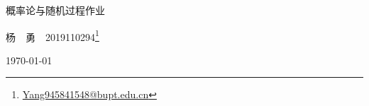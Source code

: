 \documentclass[11pt,UTF8]{ctexbook}
\newcommand{\hei}{\heiti}
\theoremstyle{plain}
\numberwithin{equation}{chapter}
\numberwithin{algorithm}{chapter}
\begin{document}
	
	\frontmatter
	\begin{titlepage}\Large
		\renewcommand{\thefootnote}{\fnsymbol{footnote}}
		\begin{center}
			\vspace*{3cm}
			{\hei\Huge 概率论与随机过程作业} \bigskip
			
			{\hei\LARGE 杨~~勇~~2019110294\footnote{{\large \url{Yang945841548@bupt.edu.cn}}}} \medskip
			
			\today
			
		\end{center}
	\end{titlepage}
	
	\clearpage{\pagestyle{empty}\cleardoublepage}
	\tableofcontents
	
	
	\mainmatter
	
	
	
	
	
	
	
	
	
	\clearpage{\pagestyle{empty}\cleardoublepage}
	\backmatter
	
	
\end{document}
